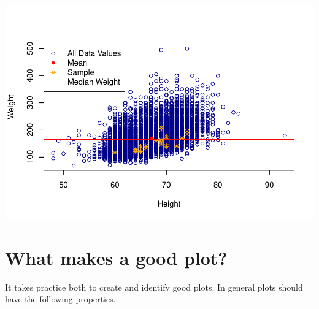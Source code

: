 \documentclass[
]{book}
\begin{document}
\includegraphics{_main_files/figure-latex/unnamed-chunk-192-1.pdf}

\hypertarget{what-makes-a-good-plot}{%
\section{What makes a good plot?}\label{what-makes-a-good-plot}}

It takes practice both to create and identify good plots. In general plots should have the following properties.
\end{document}
